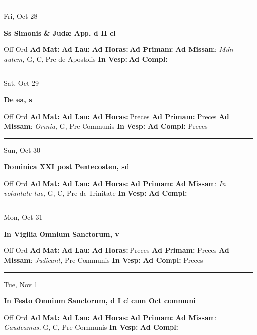 \documentclass[letterpaper, 10pt]{article}
\begin{document}
\hrule
\begin{center}
Fri, Oct 28
\end{center}\textbf{ \large Ss Simonis \& Judæ App, \textnormal{\normalsize d II cl}}
\begin{justify}
Off Ord
\textbf{Ad Mat: }
\textbf{Ad Lau: }
\textbf{Ad Horas: }
\textbf{Ad Primam: }
\textbf{Ad Missam}: \textit{Mihi autem,} G, C, Pre de Apostolis
\textbf{In Vesp: }
\textbf{Ad Compl: }\end{justify}



\hrule
\begin{center}
Sat, Oct 29
\end{center}\textbf{ \large De ea, \textnormal{\normalsize s}}
\begin{justify}
Off Ord
\textbf{Ad Mat: }
\textbf{Ad Lau: }
\textbf{Ad Horas: }Preces
\textbf{Ad Primam: }Preces
\textbf{Ad Missam}: \textit{Omnia,} G, Pre Communis
\textbf{In Vesp: }
\textbf{Ad Compl: }Preces\end{justify}



\hrule
\begin{center}
Sun, Oct 30
\end{center}\textbf{ \large Dominica XXI post Pentecosten, \textnormal{\normalsize sd}}
\begin{justify}
Off Ord
\textbf{Ad Mat: }
\textbf{Ad Lau: }
\textbf{Ad Horas: }
\textbf{Ad Primam: }
\textbf{Ad Missam}: \textit{In voluntate tua,} G, C, Pre de Trinitate
\textbf{In Vesp: }
\textbf{Ad Compl: }\end{justify}



\hrule
\begin{center}
Mon, Oct 31
\end{center}\textbf{ \large In Vigilia Omnium Sanctorum, \textnormal{\normalsize v}}
\begin{justify}
Off Ord
\textbf{Ad Mat: }
\textbf{Ad Lau: }
\textbf{Ad Horas: }Preces
\textbf{Ad Primam: }Preces
\textbf{Ad Missam}: \textit{Judicant,} Pre Communis
\textbf{In Vesp: }
\textbf{Ad Compl: }Preces\end{justify}



\hrule
\begin{center}
Tue, Nov 1
\end{center}\textbf{ \large In Festo Omnium Sanctorum, \textnormal{\normalsize d I cl cum Oct communi}}
\begin{justify}
Off Ord
\textbf{Ad Mat: }
\textbf{Ad Lau: }
\textbf{Ad Horas: }
\textbf{Ad Primam: }
\textbf{Ad Missam}: \textit{Gaudeamus,} G, C, Pre Communis
\textbf{In Vesp: }
\textbf{Ad Compl: }\end{justify}
\end{document}
